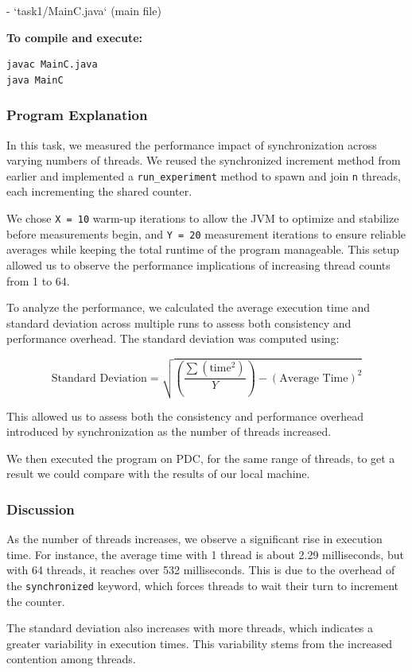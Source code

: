 \documentclass{article}
\begin{document}
- `task1/MainC.java` (main file)

\textbf{To compile and execute:}
\begin{lstlisting}[style=bash]
javac MainC.java
java MainC
\end{lstlisting}


\subsubsection{Program Explanation}
In this task, we measured the performance impact of synchronization across varying numbers of threads. We reused the synchronized increment method from earlier and implemented a \texttt{run\_experiment} method to spawn and join \texttt{n} threads, each incrementing the shared counter.

We chose \texttt{X = 10} warm-up iterations to allow the JVM to optimize and stabilize before measurements begin, and \texttt{Y = 20} measurement iterations to ensure reliable averages while keeping the total runtime of the program manageable. This setup allowed us to observe the performance implications of increasing thread counts from 1 to 64.

To analyze the performance, we calculated the average execution time and standard deviation across multiple runs to assess both consistency and performance overhead. The standard deviation was computed using:


\[
\text{Standard Deviation} = \sqrt{\left(\frac{\sum (\text{time}^2)}{Y}\right) - \left(\text{Average Time}\right)^2}
\]

This allowed us to assess both the consistency and performance overhead introduced by synchronization as the number of threads increased.

We then executed the program on PDC, for the same range of threads, to get a result we could compare with the results of our local machine.


\subsubsection{Discussion}
As the number of threads increases, we observe a significant rise in execution time. For instance, the average time with 1 thread is about 2.29 milliseconds, but with 64 threads, it reaches over 532 milliseconds. This is due to the overhead of the \texttt{synchronized} keyword, which forces threads to wait their turn to increment the counter.

The standard deviation also increases with more threads, which indicates a greater variability in execution times. This variability stems from the increased contention among threads.
\end{document}
